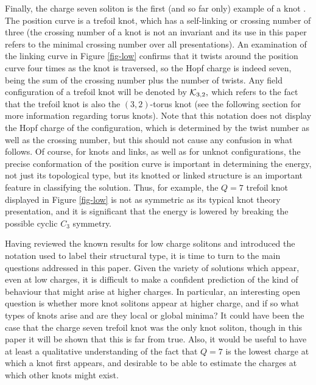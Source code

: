 \documentclass[12pt]{article}
\begin{document}
Finally, the charge seven soliton is the first (and so far only)
example of a knot \cite{BS5}. The position curve is a trefoil knot,
which has a self-linking or crossing number of three (the crossing
number of a knot is not an invariant and its use in this paper
refers to the minimal crossing number over all presentations). An
examination of the linking curve in Figure \ref{fig-low} confirms
 that it twists
around the position curve four times as the knot is traversed, so
the Hopf charge is indeed seven, being the sum of the crossing
number plus the number of twists. Any field configuration of a
trefoil knot will be denoted by ${\cal K}_{3,2},$ which refers to
the fact that the trefoil knot is also the $(3,2)$-torus knot (see
the following section for more information regarding torus knots).
Note that this notation does not display the Hopf charge of the
configuration, which is determined by the twist number as well as
the crossing number, but this should not cause any confusion in what
follows. Of course, for knots and links, as well as for unknot
configurations, the precise conformation of the position curve is
important in determining the energy, not just its topological type,
but its knotted or linked structure is an important feature in
classifying the solution. Thus, for example, the $Q=7$ trefoil knot
displayed in Figure \ref{fig-low} is not as symmetric as its typical knot
theory presentation, and it is significant that the energy is
lowered by breaking the possible cyclic $C_3$ symmetry.

Having reviewed the known results for low charge solitons and
introduced the notation used to label their structural type, it is
time to turn to the main questions addressed in this paper. Given
the variety of solutions which appear, even at low charges, it is
difficult to make a confident prediction of the kind of behaviour
that might arise at higher charges. In particular, an interesting
open question is whether more knot solitons appear at higher charge,
and if so what types of knots arise and are they local or global
minima? It could have been the case that the charge seven trefoil
knot was the only knot soliton, though in this paper it will be
shown that this is far from true. Also, it would be useful to have
at least a qualitative understanding of the fact that $Q=7$ is the
lowest charge at which a knot first appears, and desirable to be
able to estimate the charges at which other knots might exist.
\end{document}
